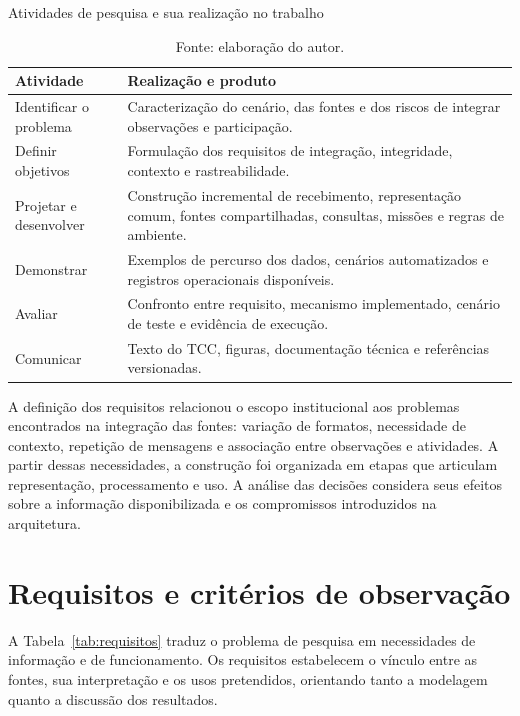 \documentclass[tcc,capa]{texufpel}
\begin{document}
\begin{table}[htbp]\centering\small
\caption{Atividades de pesquisa e sua realização no trabalho}\label{tab:metodo}
\begin{tabularx}{\textwidth}{p{3.4cm}Y}\toprule
Atividade & Realização e produto \\\midrule
Identificar o problema & Caracterização do cenário, das fontes e dos riscos de integrar observações e participação. \\
Definir objetivos & Formulação dos requisitos de integração, integridade, contexto e rastreabilidade. \\
Projetar e desenvolver & Construção incremental de recebimento, representação comum, fontes compartilhadas, consultas, missões e regras de ambiente. \\
Demonstrar & Exemplos de percurso dos dados, cenários automatizados e registros operacionais disponíveis. \\
Avaliar & Confronto entre requisito, mecanismo implementado, cenário de teste e evidência de execução. \\
Comunicar & Texto do TCC, figuras, documentação técnica e referências versionadas. \\\bottomrule
\end{tabularx}
\caption*{Fonte: elaboração do autor.}
\end{table}

A definição dos requisitos relacionou o escopo institucional aos problemas encontrados na integração das fontes: variação de formatos, necessidade de contexto, repetição de mensagens e associação entre observações e atividades. A partir dessas necessidades, a construção foi organizada em etapas que articulam representação, processamento e uso. A análise das decisões considera seus efeitos sobre a informação disponibilizada e os compromissos introduzidos na arquitetura.

\section{Requisitos e critérios de observação}
A Tabela~\ref{tab:requisitos} traduz o problema de pesquisa em necessidades de informação e de funcionamento. Os requisitos estabelecem o vínculo entre as fontes, sua interpretação e os usos pretendidos, orientando tanto a modelagem quanto a discussão dos resultados.
\end{document}
